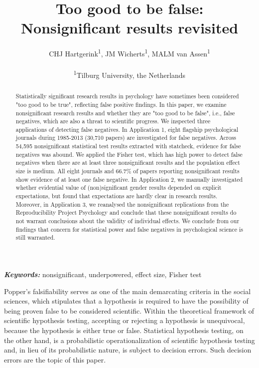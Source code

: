 \documentclass{article}
\title{Too good to be false: Nonsignificant results revisited}
\author{CHJ Hartgerink\textsuperscript{1}, JM Wicherts\textsuperscript{1}, MALM van Assen\textsuperscript{1}\\ \\
\textsuperscript{1}Tilburg University, the Netherlands}
\providecommand{\keywords}[1]{\textbf{\textit{Keywords:}} #1}
\begin{document}

\maketitle

\begin{abstract}
Statistically significant research results in psychology have sometimes been considered "too good to be true", reflecting false positive findings. In this paper, we examine nonsignificant research results and whether they are "too good to be false", i.e., false negatives, which are also a threat to scientific progress. We inspected three applications of detecting false negatives. In Application 1, eight flagship psychological journals during 1985-2013 (30,710 papers) are investigated for false negatives. Across 54,595 nonsignificant statistical test results extracted with statcheck, evidence for false negatives was abound. We applied the Fisher test, which has high power to detect false negatives when there are at least three nonsignificant results and the population effect size is medium. All eight journals and 66.7\% of papers reporting nonsignificant results show evidence of at least one false negative. In Application 2, we manually investigated whether evidential value of (non)significant gender results depended on explicit expectations, but found that expectations are hardly clear in research results. Moreover, in Application 3, we reanalysed the nonsignificant replications from the Reproducibility Project Psychology and conclude that these nonsignificant results do not warrant conclusions about the validity of individual effects. We conclude from our findings that concern for statistical power and false negatives in psychological science is still warranted.
\end{abstract}

\keywords{nonsignificant, underpowered, effect size, Fisher test}
\newpage


Popper's \cite{Popper2005-xu} falsifiability serves as one of the main demarcating criteria in the social sciences, which stipulates that a hypothesis is required to have the possibility of being proven false to be considered scientific. Within the theoretical framework of scientific hypothesis testing, accepting or rejecting a hypothesis is unequivocal, because the hypothesis is either true or false. Statistical hypothesis testing, on the other hand, is a probabilistic operationalization of scientific hypothesis testing and, in lieu of its probabilistic nature, is subject to decision errors. Such decision errors are the topic of this paper.
\end{document}
